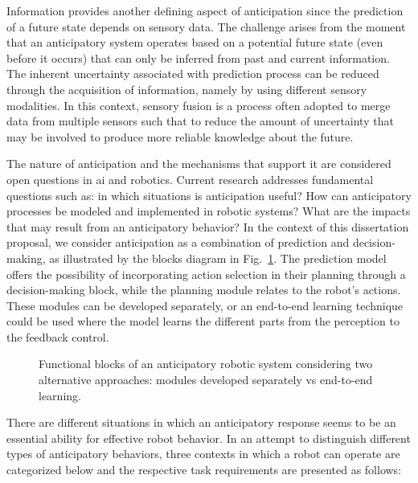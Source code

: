 Information provides another defining aspect of anticipation since the prediction of a future state depends on sensory data. The challenge arises from the moment that an anticipatory system operates based on a potential future state (even before it occurs) that can only be inferred from past and current information. The inherent uncertainty associated with prediction process can be reduced through the acquisition of information, namely by using different sensory modalities. In this context, sensory fusion is a process often adopted to merge data from multiple sensors such that to reduce the amount of uncertainty that may be involved to produce more reliable knowledge about the future.

The nature of anticipation and the mechanisms that support it are considered open questions in \acs{ai} and robotics. Current research addresses fundamental questions such as: in which situations is anticipation useful? How can anticipatory processes be modeled and implemented in robotic systems? What are the impacts that may result from an anticipatory behavior? In the context of this dissertation proposal, we consider anticipation as a combination of prediction and decision-making, as illustrated by the blocks diagram in Fig.~\ref{fig:anticipatorysystem}. The prediction model offers the possibility of incorporating action selection in their planning through a decision-making block, while the planning module relates to the robot’s actions. These modules can be developed separately, or an end-to-end learning technique could be used where the model learns the different parts from the perception to the feedback control. 

\begin{figure}[H]%
    \centering
    
    \caption{Functional blocks of an anticipatory robotic system considering two alternative approaches: modules developed separately vs end-to-end learning.}
    \label{fig:anticipatorysystem}
\end{figure}

There are different situations in which an anticipatory response seems to be an essential ability for effective robot behavior. In an attempt to distinguish different types of anticipatory behaviors, three contexts in which a robot can operate are categorized below and the respective task requirements are presented as follows:

